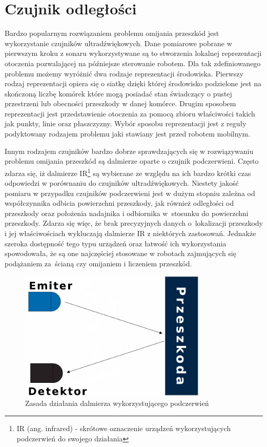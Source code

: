 \section{Czujnik odległości}
\label{sec:ir-sensors}
Bardzo popularnym rozwiązaniem problemu omijania przeszkód jest wykorzystanie
czujników ultradźwiękowych. Dane pomiarowe pobrane w pierwszym kroku z sonaru
wykorzystywane są to stworzenia lokalnej reprezentacji otoczenia pozwalającej na
późniejsze sterowanie robotem\cite{ObstaclesAvoidanceIR}. Dla tak zdefiniowanego
problemu możemy wyróżnić dwa rodzaje reprezentacji środowiska. Pierwszy rodzaj
reprezentacji opiera się o siatkę dzięki której środowisko podzielone jest na
skończoną liczbę komórek które mogą posiadać stan świadczący o pustej przestrzeni
lub obecności przeszkody w danej komórce. Drugim sposobem reprezentacji jest
przedstawienie otoczenia za pomocą zbioru właściwości takich jak punkty, linie
oraz płaszczyzny. Wybór sposobu reprezentacji jest z reguły podyktowany
rodzajem problemu jaki stawiany jest przed robotem mobilnym.

Innym rodzajem czujników bardzo dobrze sprawdzających się w rozwiązywaniu
problemu omijania przeszkód są dalmierze oparte o czujnik podczerwieni. Często
zdarza się, iż dalmierze IR\footnote{IR (ang. infrared) - skrótowe oznaczenie
urządzeń wykorzystujących podczerwień do swojego działania} są wybierane ze
względu na ich bardzo krótki czas odpowiedzi w porównaniu do czujników
ultradźwiękowych. Niestety jakość pomiaru w przypadku
czujników podczerwieni jest w dużym stopniu zależna od współczynnika odbicia
powierzchni przeszkody, jak również odległości od przeszkody oraz położenia
nadajnika i odbiornika w~stosunku do powierzchni przeszkody. Zdarza się więc, że
brak precyzyjnych danych o~lokalizacji przeszkody i jej właściwościach
wykluczają dalmierze IR z niektórych zastosowań. Jednakże szeroka dostępność
tego typu urządzeń oraz łatwość ich wykorzystania spowodowała, że są one
najczęściej stosowane w robotach zajmujących się podążaniem za~ścianą czy
omijaniem i liczeniem przeszkód.

\begin{figure}[h!]
 \centering
 \includegraphics[height=62mm]{../images/ch04/ir_sensor.png}
 \caption{Zasada działania dalmierza wykorzystującego podczerwień}
 \label{fig:IRSensors}
\end{figure}

